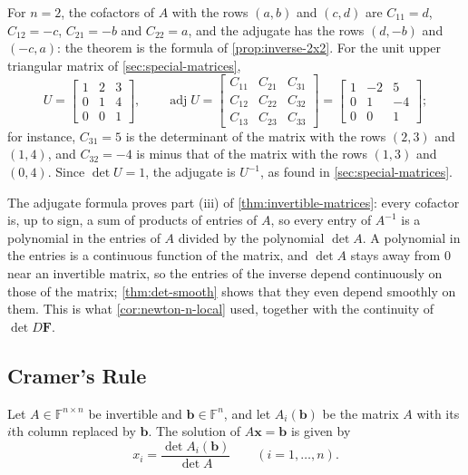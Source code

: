 For $n=2$, the cofactors of $A$ with the rows $(a,b)$ and $(c,d)$ are $C_{11}=d$, $C_{12}=-c$, $C_{21}=-b$ and $C_{22}=a$, and the adjugate has the rows $(d,-b)$ and $(-c,a)$: the theorem is the formula of \cref{prop:inverse-2x2}. For the unit upper triangular matrix of \cref{sec:special-matrices},
\[
U=\begin{bmatrix}1&2&3\\0&1&4\\0&0&1\end{bmatrix},\qquad\operatorname{adj}U=\begin{bmatrix}C_{11}&C_{21}&C_{31}\\C_{12}&C_{22}&C_{32}\\C_{13}&C_{23}&C_{33}\end{bmatrix}=\begin{bmatrix}1&-2&5\\0&1&-4\\0&0&1\end{bmatrix};
\]
for instance, $C_{31}=5$ is the determinant of the matrix with the rows $(2,3)$ and $(1,4)$, and $C_{32}=-4$ is minus that of the matrix with the rows $(1,3)$ and $(0,4)$. Since $\det U=1$, the adjugate is $U^{-1}$, as found in \cref{sec:special-matrices}.

The adjugate formula proves part (iii) of \cref{thm:invertible-matrices}: every cofactor is, up to sign, a sum of products of entries of $A$, so every entry of $A^{-1}$ is a polynomial in the entries of $A$ divided by the polynomial $\det A$. A polynomial in the entries is a continuous function of the matrix, and $\det A$ stays away from $0$ near an invertible matrix, so the entries of the inverse depend continuously on those of the matrix; \cref{thm:det-smooth} shows that they even depend smoothly on them. This is what \cref{cor:newton-n-local} used, together with the continuity of $\det D\mathbf F$.

\subsection{Cramer's Rule}

\begin{theorem}
\label{thm:cramer}
Let $A\in\mathbb F^{n\times n}$ be invertible and $\mathbf b\in\mathbb F^n$, and let $A_i(\mathbf b)$ be the matrix $A$ with its $i$th column replaced by $\mathbf b$. The solution of $A\mathbf x=\mathbf b$ is given by
\[
x_i=\frac{\det A_i(\mathbf b)}{\det A}\qquad(i=1,\ldots,n).
\]
\end{theorem}

